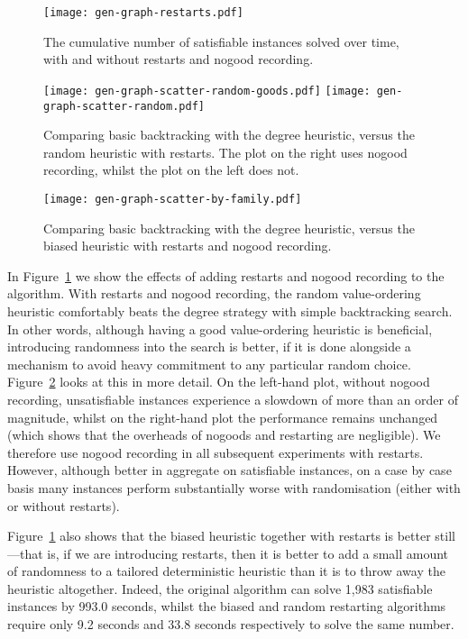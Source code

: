 \documentclass[a4paper,UKenglish]{lipics-v2018}
\newcommand{\figureref}[1]{Figure~\ref{#1}}
\newcommand{\Figureref}[1]{Figure~\ref{#1}}
\begin{document}
\begin{figure}[p]
    \centering
    \texttt{[image: gen-graph-restarts.pdf]}

    \caption{The cumulative number of satisfiable instances solved over time, with and without
    restarts and nogood recording.}
    \label{figure:restarts}
\end{figure}

\begin{figure}[p]
    \texttt{[image: gen-graph-scatter-random-goods.pdf]}
    \hfill
    \texttt{[image: gen-graph-scatter-random.pdf]}
    \caption{Comparing basic backtracking with the degree heuristic, versus the random heuristic
    with restarts. The plot on the right uses nogood recording, whilst the plot on the left does not.}
    \label{figure:scatter-random}
\end{figure}

\begin{figure}[p]
    \centering
    \texttt{[image: gen-graph-scatter-by-family.pdf]}

    \caption{Comparing basic backtracking with the degree heuristic, versus the biased
    heuristic with restarts and nogood recording.}
    \label{figure:scatter-by-family}
\end{figure}

In \figureref{figure:restarts} we show the effects of adding restarts and nogood recording to the
algorithm. With restarts and nogood recording,
the random value-ordering heuristic comfortably beats the degree strategy with simple backtracking
search. In other
words, although having a good value-ordering heuristic is beneficial, introducing randomness into
the search is better, if it is done alongside a mechanism to avoid heavy commitment to any
particular random choice. \Figureref{figure:scatter-random} looks at
this in more detail. On the left-hand plot, without nogood recording, unsatisfiable instances
experience a slowdown of more than an order of magnitude, whilst on the right-hand plot the
performance remains unchanged (which shows that the overheads of nogoods and restarting are
negligible). We therefore use nogood recording in all subsequent experiments with restarts. However,
although better in aggregate on satisfiable instances, on a case by case basis many instances
perform substantially worse with randomisation (either with or without restarts).

\Figureref{figure:restarts} also shows that the biased heuristic together with restarts is better
still---that is, if we are introducing restarts, then it is better to add a small amount of
randomness to a tailored deterministic heuristic than it is to throw away the heuristic altogether.
Indeed, the original algorithm can solve 1,983 satisfiable instances by 993.0 seconds, whilst the
biased and random restarting algorithms require only 9.2 seconds and 33.8 seconds respectively to
solve the same number.
\end{document}
